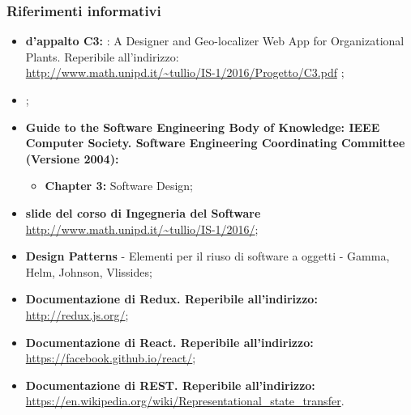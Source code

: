 	\subsubsection{Riferimenti informativi}
	\begin{itemize}
		\item \textbf{ d'appalto C3:} \progetto: A Designer and Geo-localizer Web App for Organizational Plants. Reperibile all'indirizzo:\\ \url{http://www.math.unipd.it/~tullio/IS-1/2016/Progetto/C3.pdf} ;
		\item \adrv;
		\item \textbf{Guide to the Software Engineering Body of Knowledge: IEEE Computer Society. Software Engineering Coordinating Committee (Versione 2004):}
		\begin{itemize}
			\item \textbf{Chapter 3:} Software Design;
		\end{itemize}
		\item \textbf{slide del corso di Ingegneria del Software}\\
		\url{http://www.math.unipd.it/~tullio/IS-1/2016/};
		\item \textbf{Design Patterns} - Elementi per il riuso di software a oggetti - Gamma, Helm, Johnson, Vlissides;
		\item \textbf{Documentazione di Redux. Reperibile all'indirizzo: \\}\url{http://redux.js.org/};
		\item \textbf{Documentazione di React. Reperibile all'indirizzo: \\}\url{https://facebook.github.io/react/};
		\item \textbf{Documentazione di REST. Reperibile all'indirizzo: \\}\url{https://en.wikipedia.org/wiki/Representational_state_transfer}.
	\end{itemize}
